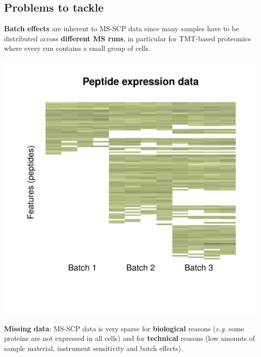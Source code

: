 \documentclass{article}
\begin{document}
\begin{multicols}{2}
\begin{minipage}[t]{\linewidth}
  \section*{\huge Problems to tackle}
  \vspace{0.1cm}
\end{minipage}
\begin{minipage}[t]{0.45\linewidth}
  \large
  \textbf{Batch effects} \normalsize are inherent to MS-SCP data since many samples have to be distributed across \textbf{different MS runs}, in particular for TMT-based proteomics where every run contains a small group of cells.
  \begin{center}
    \includegraphics[width=\linewidth, trim={2cm 9cm 2cm 3.5cm},clip]{figs/batchEffect.png}
  \end{center}
\end{minipage}
\hspace{1cm}
\begin{minipage}[t]{0.45\linewidth}
  \large
  \textbf{Missing data}: \normalsize MS-SCP data is very sparse for \textbf{biological} reasons (\textit{e.g.} some proteins are not expressed in all cells) and for \textbf{technical} reasons (low amounts of sample material, instrument sensitivity and batch effects).
  \begin{center}

\end{center}
\end{minipage}
\end{multicols}
\end{document}

